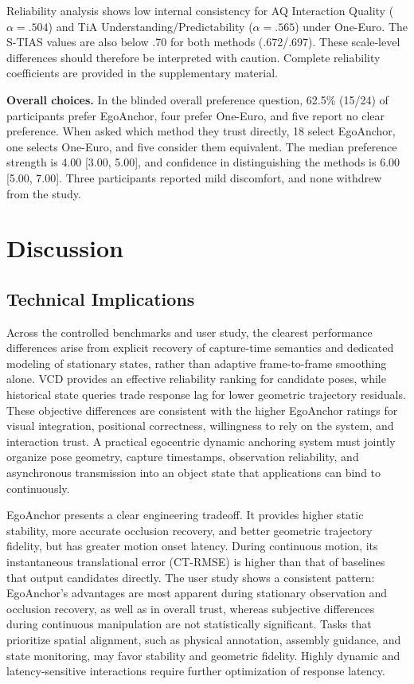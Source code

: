 \documentclass[review]{vgtc}
\begin{document}
Reliability analysis shows low internal consistency for AQ Interaction Quality ($\alpha=.504$) and TiA Understanding/Predictability ($\alpha=.565$) under One-Euro. The S-TIAS values are also below .70 for both methods (.672/.697). These scale-level differences should therefore be interpreted with caution. Complete reliability coefficients are provided in the supplementary material.

\textbf{Overall choices.}
In the blinded overall preference question, 62.5\% (15/24) of participants prefer EgoAnchor, four prefer One-Euro, and five report no clear preference. When asked which method they trust directly, 18 select EgoAnchor, one selects One-Euro, and five consider them equivalent. The median preference strength is 4.00 [3.00, 5.00], and confidence in distinguishing the methods is 6.00 [5.00, 7.00]. Three participants reported mild discomfort, and none withdrew from the study.

\section{Discussion}\label{sec:discussion}

\subsection{Technical Implications}

Across the controlled benchmarks and user study, the clearest performance differences arise from explicit recovery of capture-time semantics and dedicated modeling of stationary states, rather than adaptive frame-to-frame smoothing alone. VCD provides an effective reliability ranking for candidate poses, while historical state queries trade response lag for lower geometric trajectory residuals. These objective differences are consistent with the higher EgoAnchor ratings for visual integration, positional correctness, willingness to rely on the system, and interaction trust. A practical egocentric dynamic anchoring system must jointly organize pose geometry, capture timestamps, observation reliability, and asynchronous transmission into an object state that applications can bind to continuously.

EgoAnchor presents a clear engineering tradeoff. It provides higher static stability, more accurate occlusion recovery, and better geometric trajectory fidelity, but has greater motion onset latency. During continuous motion, its instantaneous translational error (CT-RMSE) is higher than that of baselines that output candidates directly. The user study shows a consistent pattern: EgoAnchor's advantages are most apparent during stationary observation and occlusion recovery, as well as in overall trust, whereas subjective differences during continuous manipulation are not statistically significant. Tasks that prioritize spatial alignment, such as physical annotation, assembly guidance, and state monitoring, may favor stability and geometric fidelity. Highly dynamic and latency-sensitive interactions require further optimization of response latency.
\end{document}
